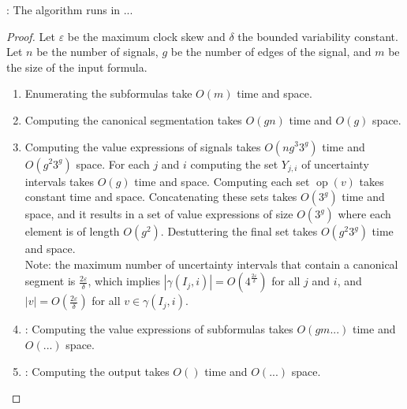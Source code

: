 \begin{claim}
	\TODO: The algorithm runs in ... %
\end{claim}
\begin{proof}
	Let $\varepsilon$ be the maximum clock skew and $\delta$ the bounded variability constant.
	Let $n$ be the number of signals, $g$ be the number of edges of the signal, and $m$ be the size of the input formula.
		
	\begin{enumerate}
		\item 
		Enumerating the subformulas take $O(m)$ time and space.
		
		\item 
		Computing the canonical segmentation takes $O(gn)$ time and $O(g)$ space. %
		
		\item {}
		Computing the value expressions of signals takes \alert{$O(n g^3 3^g)$} time and \alert{$O(g^2 3^g)$} space.
		For each $j$ and $i$ computing the set $Y_{j,i}$ of uncertainty intervals takes $O(g)$ time and space.
		Computing each set $\operatorname{op}(v)$ takes constant time and space.
		Concatenating these sets takes $O(3^g)$ time and space, and it results in a set of value expressions of size $O(3^g)$ where each element is of length $O(g^2)$.
		Destuttering the final set takes $O(g^2 3^g)$ time and space.\\
		Note: the maximum number of uncertainty intervals that contain a canonical segment is $\frac{2\varepsilon}{\delta}$, which implies $|\gamma(I_j, i)| = O(4^{\frac{2\varepsilon}{\delta}})$ for all $j$ and $i$, and $|v| = O(\frac{2\varepsilon}{\delta})$ for all $v \in \gamma(I_j, i)$.
		
		\item \TODO:
		Computing the value expressions of subformulas takes $O(g m ...)$ time %
		and $O(...)$ space. %
		
		\item \TODO:
		Computing the output takes $O()$ time %
		and $O(...)$ space. %
	\end{enumerate}
	
%	
%	
	

\end{proof}
